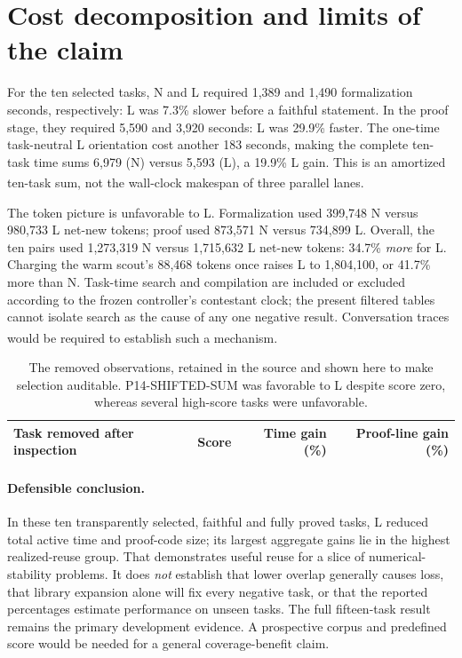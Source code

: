 \documentclass[10pt,a4paper]{article}
\newcommand{\src}[1]{\textsuperscript{\cite{#1}}}
\begin{document}
\clearpage
\section{Cost decomposition and limits of the claim}

For the ten selected tasks, N and L required 1,389 and 1,490 formalization
seconds, respectively: L was 7.3\% slower before a faithful statement. In
the proof stage, they required 5,590 and 3,920 seconds: L was 29.9\% faster.
The one-time task-neutral L orientation cost another 183 seconds, making
the complete ten-task time sums 6,979 (N) versus 5,593 (L), a 19.9\% L gain.
This is an amortized ten-task sum, not the wall-clock makespan of three
parallel lanes.\src{metrics,primary,derived}

The token picture is unfavorable to L. Formalization used 399,748 N versus
980,733 L net-new tokens; proof used 873,571 N versus 734,899 L. Overall,
the ten pairs used 1,273,319 N versus 1,715,632 L net-new tokens: 34.7\%
\emph{more} for L. Charging the warm scout's 88,468 tokens once raises L
to 1,804,100, or 41.7\% more than N. Task-time search and compilation are
included or excluded according to the frozen controller's contestant clock;
the present filtered tables cannot isolate search as the cause of any one
negative result. Conversation traces would be required to establish such a
mechanism.\src{metrics,primary,derived}

\begin{table}[H]
\centering\small
\begin{tabular}{@{}lrrr@{}}\toprule
Task removed after inspection & Score & Time gain (\%) & Proof-line gain (\%)\\\midrule

\end{tabular}
\caption{The removed observations, retained in the source and shown here to
make selection auditable. P14-SHIFTED-SUM was favorable to L despite score
zero, whereas several high-score tasks were unfavorable.\cite{metrics,reuse,derived}}
\end{table}

\paragraph{Defensible conclusion.} In these ten transparently selected,
faithful and fully proved tasks, L reduced total active time and proof-code
size; its largest aggregate gains lie in the highest realized-reuse group.
That demonstrates useful reuse for a slice of numerical-stability problems.
It does \emph{not} establish that lower overlap generally causes loss, that
library expansion alone will fix every negative task, or that the reported
percentages estimate performance on unseen tasks. The full fifteen-task
result remains the primary development evidence. A prospective corpus and
predefined score would be needed for a general coverage-benefit claim.
\end{document}
